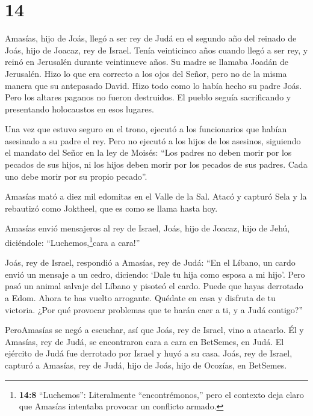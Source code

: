 \hypertarget{section-13}{%
\section{14}\label{section-13}}

 Amasías, hijo de Joás, llegó a ser rey de Judá en el
segundo año del reinado de Joás, hijo de Joacaz, rey de Israel.
 Tenía veinticinco años cuando llegó a ser rey, y reinó en
Jerusalén durante veintinueve años. Su madre se llamaba Joadán de
Jerusalén.  Hizo lo que era correcto a los ojos del Señor,
pero no de la misma manera que su antepasado David. Hizo todo como lo
había hecho su padre Joás.  Pero los altares paganos no
fueron destruidos. El pueblo seguía sacrificando y presentando
holocaustos en esos lugares.

 Una vez que estuvo seguro en el trono, ejecutó a los
funcionarios que habían asesinado a su padre el rey.  Pero
no ejecutó a los hijos de los asesinos, siguiendo el mandato del Señor
en la ley de Moisés: ``Los padres no deben morir por los pecados de sus
hijos, ni los hijos deben morir por los pecados de sus padres. Cada uno
debe morir por su propio pecado''.

 Amasías mató a diez mil edomitas en el Valle de la Sal.
Atacó y capturó Sela y la rebautizó como Joktheel, que es como se llama
hasta hoy.

 Amasías envió mensajeros al rey de Israel, Joás, hijo de
Joacaz, hijo de Jehú, diciéndole: ``Luchemos,\footnote{\textbf{14:8}
  ``Luchemos'': Literalmente ``encontrémonos,'' pero el contexto deja
  claro que Amasías intentaba provocar un conflicto armado.}cara a
cara!''

 Joás, rey de Israel, respondió a Amasías, rey de Judá: ``En
el Líbano, un cardo envió un mensaje a un cedro, diciendo: `Dale tu hija
como esposa a mi hijo'. Pero pasó un animal salvaje del Líbano y pisoteó
el cardo.  Puede que hayas derrotado a Edom. Ahora te has
vuelto arrogante. Quédate en casa y disfruta de tu victoria. ¿Por qué
provocar problemas que te harán caer a ti, y a Judá contigo?''

 PeroAmasías se negó a escuchar, así que Joás, rey de
Israel, vino a atacarlo. Él y Amasías, rey de Judá, se encontraron cara
a cara en BetSemes, en Judá.  El ejército de Judá fue
derrotado por Israel y huyó a su casa.  Joás, rey de
Israel, capturó a Amasías, rey de Judá, hijo de Joás, hijo de Ocozías,
en BetSemes.

